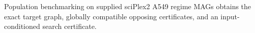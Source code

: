 Population benchmarking on supplied sciPlex2 A549 regime MAGs obtains the exact target graph, globally compatible opposing certificates, and an input-conditioned search certificate.